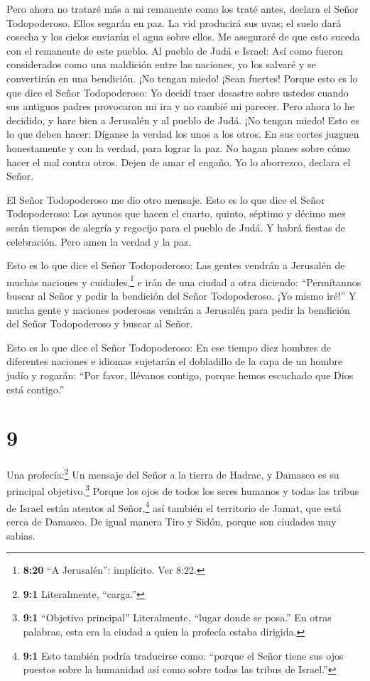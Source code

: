  Pero ahora no trataré más a mi remanente como los traté
antes, declara el Señor Todopoderoso.  Ellos segarán en
paz. La vid producirá sus uvas; el suelo dará cosecha y los cielos
enviarán el agua sobre ellos. Me aseguraré de que esto suceda con el
remanente de este pueblo.  Al pueblo de Judá e Israel: Así
como fueron considerados como una maldición entre las naciones, yo los
salvaré y se convertirán en una bendición. ¡No tengan miedo! ¡Sean
fuertes!  Porque esto es lo que dice el Señor Todopoderoso:
Yo decidí traer desastre sobre ustedes cuando sus antiguos padres
provocaron mi ira y no cambié mi parecer.  Pero ahora lo he
decidido, y hare bien a Jerusalén y al pueblo de Judá. ¡No tengan miedo!
 Esto es lo que deben hacer: Díganse la verdad los unos a
los otros. En sus cortes juzguen honestamente y con la verdad, para
lograr la paz.  No hagan planes sobre cómo hacer el mal
contra otros. Dejen de amar el engaño. Yo lo aborrezco, declara el
Señor.

 El Señor Todopoderoso me dio otro mensaje. 
Esto es lo que dice el Señor Todopoderoso: Los ayunos que hacen el
cuarto, quinto, séptimo y décimo mes serán tiempos de alegría y regocijo
para el pueblo de Judá. Y habrá fiestas de celebración. Pero amen la
verdad y la paz.

 Esto es lo que dice el Señor Todopoderoso: Las gentes
vendrán a Jerusalén de muchas naciones y cuidades,\footnote{\textbf{8:20}
  ``A Jerusalén'': implícito. Ver 8:22.}  e irán de una
ciudad a otra diciendo: ``Permítannos buscar al Señor y pedir la
bendición del Señor Todopoderoso. ¡Yo mismo iré!''  Y mucha
gente y naciones poderosas vendrán a Jerusalén para pedir la bendición
del Señor Todopoderoso y buscar al Señor.

 Esto es lo que dice el Señor Todopoderoso: En ese tiempo
diez hombres de diferentes naciones e idiomas sujetarán el dobladillo de
la capa de un hombre judío y rogarán: ``Por favor, llévanos contigo,
porque hemos escuchado que Dios está contigo.''

\hypertarget{section-8}{%
\section{9}\label{section-8}}

 Una profecía:\footnote{\textbf{9:1} Literalmente,
  ``carga.''} Un mensaje del Señor a la tierra de Hadrac, y Damasco es
su principal objetivo.\footnote{\textbf{9:1} ``Objetivo principal''
  Literalmente, ``lugar donde se posa.'' En otras palabras, esta era la
  ciudad a quien la profecía estaba dirigida.} Porque los ojos de todos
los seres humanos y todas las tribus de Israel están atentos al
Señor,\footnote{\textbf{9:1} Esto también podría traducirse como:
  ``porque el Señor tiene sus ojos puestos sobre la humanidad así como
  sobre todas las tribus de Israel.''}  así también el
territorio de Jamat, que está cerca de Damasco. De igual manera Tiro y
Sidón, porque son ciudades muy sabias.

